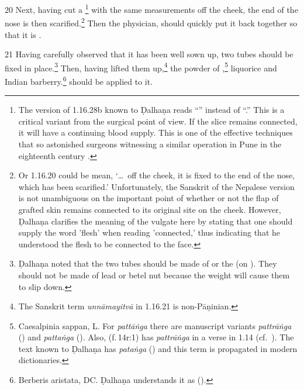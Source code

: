 \begin{translation}
    \item[20] Next, having cut a \footnote{The
    version of 1.16.28b known to Ḍalhaṇa \citep[81]{vulgate} reads “” instead of “.”
    This is a critical variant from the surgical point of view.  If the slice remains
    connected, it will have a continuing blood supply.  This is one of the effective 
    techniques that so astonished surgeons witnessing a similar operation in Pune in
    the eighteenth century \citep[see][67--70]{wuja-2003}.} with the same
    measurements off the cheek, the end of the nose is then scarified.\footnote{Or 1.16.20 could be mean, 
    `\ldots\ off the cheek, it is fixed to the end of the nose, which has been
    scarified.' Unfortunately, the Sanskrit of the Nepalese version is not unambiguous on the
    important point of whether or not the flap of grafted skin remains connected
    to its original site on the cheek. However, Ḍalhaṇa \citep[81]{vulgate} clarifies the meaning of the vulgate here by stating that one should supply the word 'flesh' when reading 'connected,' thus indicating that he understood the flesh to be connected to the face.} %
%
Then the  physician, 
    should quickly put it back together so that it is 
    .
    \label{well-joined}
    
    \item[21] 
    Having carefully observed that it has been well sown up,
    two tubes should be fixed in place.\footnote{Ḍalhaṇa noted that the two tubes 
    should be made of  or the  (on ). They should not be made of 
    lead or betel nut because the weight will cause them to slip down.} Then, 
    having lifted them up,\footnote{The 
    Sanskrit term \emph{unnāmayitvā} in 1.16.21 is non-Pāṇinian.}
    the powder of ,\footnote{Caesalpinia sappan, L. 
    For \emph{pattāṅga} there are manuscript variants 
    \emph{pattrāṅga} () and \emph{pattaṅga} 
    ().  Also,  
    (f.\,14r:1) has \emph{pattrāṅga} in a verse in 1.14 (cf.\ ). The 
    text known to Ḍalhaṇa  has \emph{pataṅga} () and this term 
    is propagated in modern dictionaries.}
    {liquorice}
    and
    Indian barberry.\footnote{Berberis aristata, DC.
Ḍalhaṇa understands it as  (\cite[81]{vulgate}).}
    should be applied to it.
    

\end{translation}
